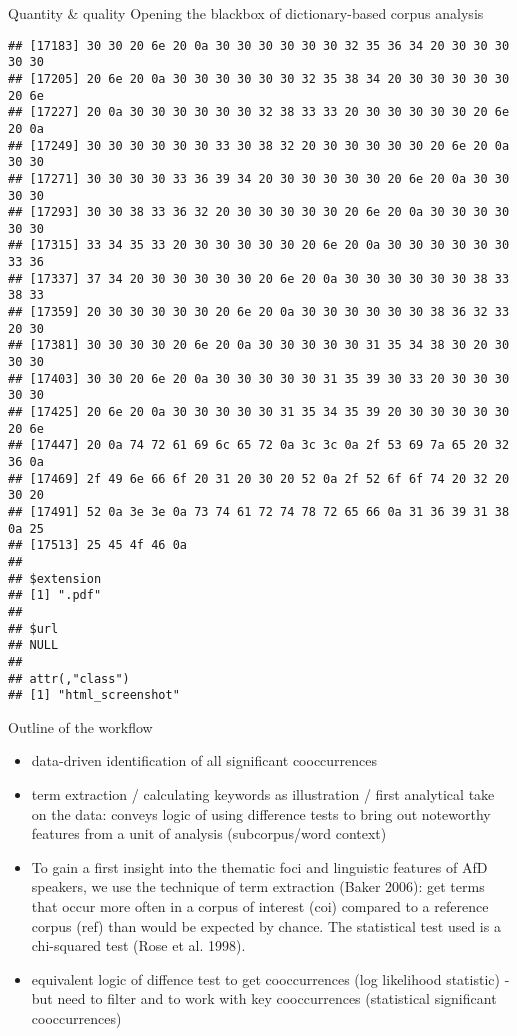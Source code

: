 \documentclass[
  ignorenonframetext,
]{beamer}
\begin{document}
\begin{frame}[fragile]{Quantity \& quality \textbar{} Opening the
blackbox of dictionary-based corpus analysis}
\begin{verbatim}
## [17183] 30 30 20 6e 20 0a 30 30 30 30 30 30 32 35 36 34 20 30 30 30 30 30
## [17205] 20 6e 20 0a 30 30 30 30 30 30 32 35 38 34 20 30 30 30 30 30 20 6e
## [17227] 20 0a 30 30 30 30 30 30 32 38 33 33 20 30 30 30 30 30 20 6e 20 0a
## [17249] 30 30 30 30 30 30 33 30 38 32 20 30 30 30 30 30 20 6e 20 0a 30 30
## [17271] 30 30 30 30 33 36 39 34 20 30 30 30 30 30 20 6e 20 0a 30 30 30 30
## [17293] 30 30 38 33 36 32 20 30 30 30 30 30 20 6e 20 0a 30 30 30 30 30 30
## [17315] 33 34 35 33 20 30 30 30 30 30 20 6e 20 0a 30 30 30 30 30 30 33 36
## [17337] 37 34 20 30 30 30 30 30 20 6e 20 0a 30 30 30 30 30 30 38 33 38 33
## [17359] 20 30 30 30 30 30 20 6e 20 0a 30 30 30 30 30 30 38 36 32 33 20 30
## [17381] 30 30 30 30 20 6e 20 0a 30 30 30 30 30 31 35 34 38 30 20 30 30 30
## [17403] 30 30 20 6e 20 0a 30 30 30 30 30 31 35 39 30 33 20 30 30 30 30 30
## [17425] 20 6e 20 0a 30 30 30 30 30 31 35 34 35 39 20 30 30 30 30 30 20 6e
## [17447] 20 0a 74 72 61 69 6c 65 72 0a 3c 3c 0a 2f 53 69 7a 65 20 32 36 0a
## [17469] 2f 49 6e 66 6f 20 31 20 30 20 52 0a 2f 52 6f 6f 74 20 32 20 30 20
## [17491] 52 0a 3e 3e 0a 73 74 61 72 74 78 72 65 66 0a 31 36 39 31 38 0a 25
## [17513] 25 45 4f 46 0a
## 
## $extension
## [1] ".pdf"
## 
## $url
## NULL
## 
## attr(,"class")
## [1] "html_screenshot"
\end{verbatim}

\end{frame}

\begin{frame}{Outline of the workflow}
\protect\hypertarget{outline-of-the-workflow}{}

\begin{itemize}
\item
  data-driven identification of all significant cooccurrences
\item
  term extraction / calculating keywords as illustration / first
  analytical take on the data: conveys logic of using difference tests
  to bring out noteworthy features from a unit of analysis
  (subcorpus/word context)
\item
  To gain a first insight into the thematic foci and linguistic features
  of AfD speakers, we use the technique of term extraction (Baker 2006):
  get terms that occur more often in a corpus of interest (coi) compared
  to a reference corpus (ref) than would be expected by chance. The
  statistical test used is a chi-squared test (Rose et al. 1998).
\item
  equivalent logic of diffence test to get cooccurrences (log likelihood
  statistic) - but need to filter and to work with key cooccurrences
  (statistical significant cooccurrences)
\end{itemize}

\end{frame}
\end{document}
